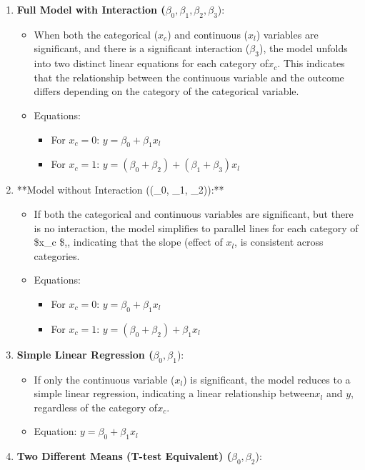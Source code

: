\documentclass[
  letterpaper,
  DIV=11,
  numbers=noendperiod]{scrreprt}
\providecommand{\tightlist}{%
  \setlength{\itemsep}{0pt}\setlength{\parskip}{0pt}}
\begin{document}
\begin{enumerate}
\def\labelenumi{\arabic{enumi}.}
\tightlist
\item
  \textbf{Full Model with Interaction
  (}\(\beta_0, \beta_1, \beta_2, \beta_3\)):

  \begin{itemize}
  \tightlist
  \item
    When both the categorical (\(x_c\)) and continuous (\(x_l\))
    variables are significant, and there is a significant interaction
    (\(\beta_3\)), the model unfolds into two distinct linear equations
    for each category of\(x_c\). This indicates that the relationship
    between the continuous variable and the outcome differs depending on
    the category of the categorical variable.
  \item
    Equations:

    \begin{itemize}
    \tightlist
    \item
      For \(x_c = 0\): \(y = \beta_0 + \beta_1x_l\)
    \item
      For \(x_c = 1\):
      \(y = (\beta_0 + \beta_2) + (\beta_1 + \beta_3)x_l\)
    \end{itemize}
  \end{itemize}
\item
  **Model without Interaction ((\beta\_0, \beta\_1, \beta\_2)):**

  \begin{itemize}
  \tightlist
  \item
    If both the categorical and continuous variables are significant,
    but there is no interaction, the model simplifies to parallel lines
    for each category of \$x\_c \$,, indicating that the slope (effect
    of \(x_l\), is consistent across categories.
  \item
    Equations:

    \begin{itemize}
    \tightlist
    \item
      For \(x_c = 0\): \(y = \beta_0 + \beta_1x_l\)
    \item
      For \(x_c = 1\): \(y = (\beta_0 + \beta_2) + \beta_1x_l\)
    \end{itemize}
  \end{itemize}
\item
  \textbf{Simple Linear Regression (}\(\beta_0, \beta_1\)):

  \begin{itemize}
  \tightlist
  \item
    If only the continuous variable (\(x_l\)) is significant, the model
    reduces to a simple linear regression, indicating a linear
    relationship between\(x_l\) and \(y\), regardless of the category
    of\(x_c\).
  \item
    Equation: \(y = \beta_0 + \beta_1x_l\)
  \end{itemize}
\item
  \textbf{Two Different Means (T-test Equivalent)
  (}\(\beta_0, \beta_2\)):


\end{enumerate}
\end{document}
